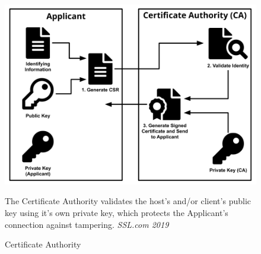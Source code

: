 \documentclass[12pt]{article}
\begin{document}
\begin{figure}[ht]
    \begin{minipage}[c]{0.5\textwidth}
        \includegraphics[width=\textwidth]{ca_diagram.png}
    \end{minipage}
    \begin{minipage}[c]{0.4\textwidth}
        \caption{Certificate Authority}
        \label{CA}%
        \sffamily\footnotesize The Certificate Authority validates the host's and/or client's public key using it's own private key, which protects the Applicant's connection against tampering.
        \scriptsize\textcopyright\rmfamily\textit{SSL.com 2019}
    \end{minipage}
\end{figure}
\end{document}
